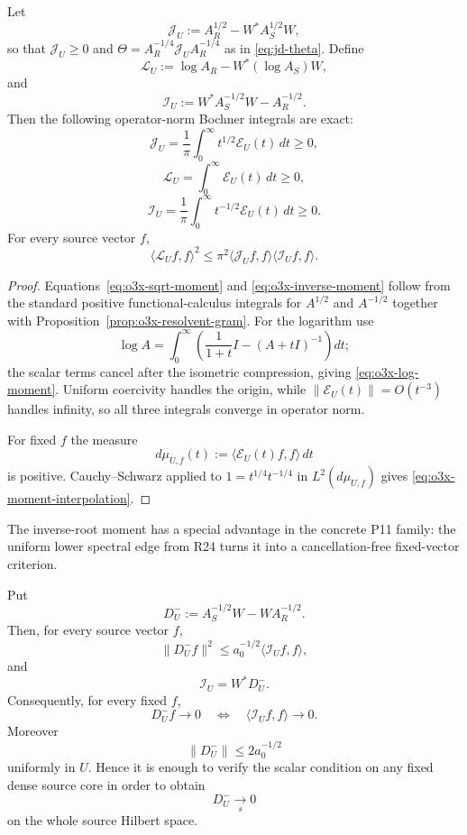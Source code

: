 \begin{proposition}
\label{prop:o3x-three-moments}
Let
\[
 \mathscr J_U:=A_R^{1/2}-W^*A_S^{1/2}W,
\]
so that $\mathscr J_U\ge0$ and
$\Theta=A_R^{-1/4}\mathscr J_UA_R^{-1/4}$ as in
\eqref{eq:jd-theta}.  Define
\[
 \mathscr L_U:=\log A_R-W^*(\log A_S)W,
\]
and
\[
 \mathscr I_U:=W^*A_S^{-1/2}W-A_R^{-1/2}.
\]
Then the following operator-norm Bochner integrals are exact:
\[
 \boxed{
 \mathscr J_U
 =\frac1\pi\int_0^\infty t^{1/2}\mathscr E_U(t)\,dt
 \ge0,
 }
\tag{O3X.5}\label{eq:o3x-sqrt-moment}
\]
\[
 \boxed{
 \mathscr L_U
 =\int_0^\infty\mathscr E_U(t)\,dt
 \ge0,
 }
\tag{O3X.6}\label{eq:o3x-log-moment}
\]
\[
 \boxed{
 \mathscr I_U
 =\frac1\pi\int_0^\infty t^{-1/2}\mathscr E_U(t)\,dt
 \ge0.
 }
\tag{O3X.7}\label{eq:o3x-inverse-moment}
\]
For every source vector $f$,
\[
 \boxed{
 \langle\mathscr L_Uf,f\rangle^2
 \le
 \pi^2\langle\mathscr J_Uf,f\rangle
       \langle\mathscr I_Uf,f\rangle.
 }
\tag{O3X.8}\label{eq:o3x-moment-interpolation}
\]
\end{proposition}

\begin{proof}
Equations~\eqref{eq:o3x-sqrt-moment} and
\eqref{eq:o3x-inverse-moment} follow from the standard positive functional-calculus
integrals for $A^{1/2}$ and $A^{-1/2}$ together with
Proposition~\ref{prop:o3x-resolvent-gram}.  For the logarithm use
\[
 \log A
 =\int_0^\infty
 \left(\frac1{1+t}I-(A+tI)^{-1}\right)dt;
\]
the scalar terms cancel after the isometric compression, giving
\eqref{eq:o3x-log-moment}.  Uniform coercivity handles the origin, while
$\|\mathscr E_U(t)\|=O(t^{-3})$ handles infinity, so all three integrals converge in
operator norm.

For fixed $f$ the measure
\[
 d\mu_{U,f}(t)
 :=\langle\mathscr E_U(t)f,f\rangle\,dt
\]
is positive.  Cauchy--Schwarz applied to
$1=t^{1/4}t^{-1/4}$ in $L^2(d\mu_{U,f})$ gives
\eqref{eq:o3x-moment-interpolation}.
\end{proof}

The inverse-root moment has a special advantage in the concrete P11 family: the
uniform lower spectral edge from R24 turns it into a cancellation-free fixed-vector
criterion.

\begin{theorem}
\label{thm:o3x-inverse-criterion}
Put
\[
 D_U^-:=A_S^{-1/2}W-WA_R^{-1/2}.
\]
Then, for every source vector $f$,
\[
 \boxed{
 \|D_U^-f\|^2
 \le a_0^{-1/2}\langle\mathscr I_Uf,f\rangle,
 }
\tag{O3X.9}\label{eq:o3x-inverse-vector-bound}
\]
and
\[
 \boxed{
 \mathscr I_U=W^*D_U^-.
 }
\tag{O3X.10}\label{eq:o3x-I-compression}
\]
Consequently, for every fixed $f$,
\[
 \boxed{
 D_U^-f\longrightarrow0
 \quad\Longleftrightarrow\quad
 \langle\mathscr I_Uf,f\rangle\longrightarrow0.
 }
\tag{O3X.11}\label{eq:o3x-fixed-equivalence}
\]
Moreover
\[
 \|D_U^-\|\le2a_0^{-1/2}
\tag{O3X.12}\label{eq:o3x-D-uniform}
\]
uniformly in $U$.  Hence it is enough to verify the scalar condition on any fixed
dense source core in order to obtain
\[
 D_U^-\xrightarrow[s]{}0
\]
on the whole source Hilbert space.
\end{theorem}


